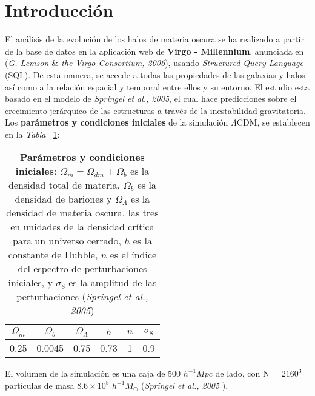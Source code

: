 \section{Introducción} 
\label{sec:1} %

El análisis de la evolución de los halos de materia oscura se ha realizado a partir de la base de datos en la aplicación web de \textbf{Virgo - Millennium}\cite{6}, anunciada en (\textit{G. Lemson $\&$ the Virgo Consortium, 2006}\cite{5}), usando \textit{Structured Query Language} (SQL). De esta manera, se accede a todas las propiedades de las galaxias y halos así como a la relación espacial y temporal entre ellos y su entorno. El estudio esta basado en el modelo de \textit{Springel et al., 2005}\cite{1}, el cual hace predicciones sobre el crecimiento jerárquico de las estructuras a través de la inestabilidad gravitatoria. \\ 

 Los \textbf{parámetros y condiciones iniciales} de la simulación $\Lambda$CDM, se establecen en la \textit{Tabla} ~\ref{tab:tabla1}: 
 
\begin{table}[H]
\begin{center}
\begin{tabular}{c|c|c|c|c|c}
\toprule
\cellcolor[gray]{0.9}\large{$\Omega_m$} & \cellcolor[gray]{0.9}\large{$\Omega_b$} & \cellcolor[gray]{0.9}\large{$\Omega_\Lambda$} & \cellcolor[gray]{0.9}\large{$h$} & \cellcolor[gray]{0.9}\large{$n$}& \cellcolor[gray]{0.9}\large{$\sigma_8$}\\
\midrule
0.25 & 0.0045 & 0.75 & 0.73 & 1 & 0.9 \\
\bottomrule
\end{tabular}
\end{center}
\caption{\textbf{Parámetros y condiciones iniciales}: $\Omega_m = \Omega_{dm} + \Omega_b$ es la densidad total de materia, $\Omega_b$ es la densidad de bariones y $\Omega_\Lambda$ es la densidad de materia oscura, las tres en unidades de la densidad crítica para un universo cerrado, $h$ es la constante de Hubble, $n$ es el índice del espectro de perturbaciones iniciales, y $\sigma_8$ es la amplitud de las perturbaciones (\textit{Springel et al., 2005}\cite{1})}
\label{tab:tabla1}
\end{table}

El volumen de la simulación es una caja de 500 $h^{-1}Mpc$ de lado, con N = $2160^{3}$ partículas de masa $8.6\times 10^8$ $h^{-1}M_\odot$ (\textit{Springel et al., 2005}\cite{1} \cite{7}). \\

